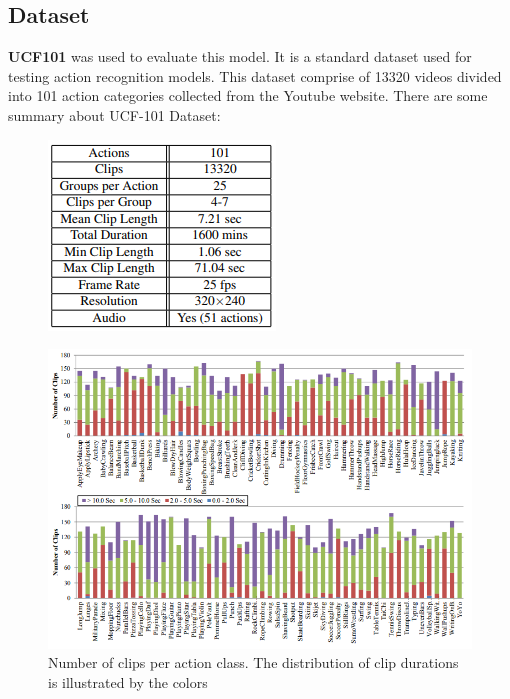 \subsection{Dataset}
\textbf{UCF101}  was used to evaluate this model. It is a standard dataset used for testing action recognition models. This dataset comprise of 13320 videos divided into 101 action categories collected from the Youtube website.
There are some summary about UCF-101 Dataset:
\begin{center}
	\begin{figure}[H]
		\centering
		\includegraphics[width=0.4\columnwidth]{images/chap3/ucf-sum.png}
		\label{chap3:ucf-sum}
	\end{figure}
\end{center}
\begin{center}
	\begin{figure}[H]
		\centering
		\includegraphics[width=1\columnwidth]{images/chap3/ucf-sum-chart-2.png}
		\caption{Number of clips per action class. The distribution of clip durations is illustrated by the colors}
		\label{chap3:ucf-sum-chart-2}
	\end{figure}
\end{center}


